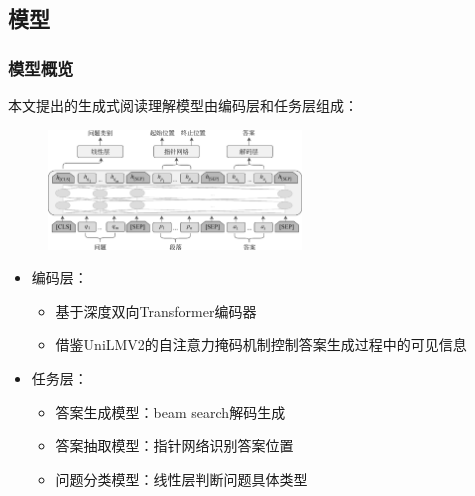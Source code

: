 \documentclass{beamer}
\begin{document}
\subsection{模型}
\begin{frame}
    \frametitle{模型概览}

    本文提出的生成式阅读理解模型由编码层和任务层组成：

    \begin{figure}
        \centering
        \includegraphics[width=0.6\textwidth]{./fig/model.jpg}
    \end{figure}

    \begin{itemize}
        \item 编码层：
        \begin{itemize}
            \item 基于深度双向Transformer编码器
            \item 借鉴UniLMV2的自注意力掩码机制控制答案生成过程中的可见信息
        \end{itemize}
        \item 任务层：
        \begin{itemize}
            \item 答案生成模型：beam search解码生成
            \item 答案抽取模型：指针网络识别答案位置
            \item 问题分类模型：线性层判断问题具体类型
        \end{itemize}
    \end{itemize}

\end{frame}
\end{document}
